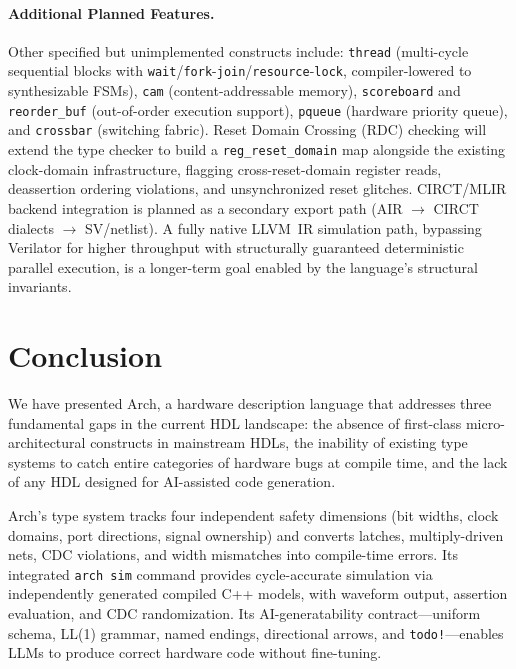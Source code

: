 \documentclass[11pt,twocolumn]{article}
\begin{document}
\paragraph{Additional Planned Features.}
Other specified but unimplemented constructs include:
\texttt{thread} (multi-cycle sequential blocks with \texttt{wait}/\texttt{fork}-\texttt{join}/\texttt{resource}-\texttt{lock}, compiler-lowered to synthesizable FSMs),
\texttt{cam} (content-addressable memory),
\texttt{scoreboard} and \texttt{reorder\_buf} (out-of-order execution support),
\texttt{pqueue} (hardware priority queue),
and \texttt{crossbar} (switching fabric).
Reset Domain Crossing (RDC) checking will extend the type checker to build a \texttt{reg\_reset\_domain} map alongside the existing clock-domain infrastructure, flagging cross-reset-domain register reads, deassertion ordering violations, and unsynchronized reset glitches.
CIRCT/MLIR backend integration is planned as a secondary export path (AIR $\to$ CIRCT dialects $\to$ SV/netlist).
A fully native LLVM~IR simulation path, bypassing Verilator for higher throughput with structurally guaranteed deterministic parallel execution, is a longer-term goal enabled by the language's structural invariants.

\section{Conclusion}\label{sec:conclusion}

We have presented Arch, a hardware description language that addresses three fundamental gaps in the current HDL landscape: the absence of first-class micro-architectural constructs in mainstream HDLs, the inability of existing type systems to catch entire categories of hardware bugs at compile time, and the lack of any HDL designed for AI-assisted code generation.

Arch's type system tracks four independent safety dimensions (bit widths, clock domains, port directions, signal ownership) and converts latches, multiply-driven nets, CDC violations, and width mismatches into compile-time errors.
Its integrated \texttt{arch sim} command provides cycle-accurate simulation via independently generated compiled C++ models, with waveform output, assertion evaluation, and CDC randomization.
Its AI-generatability contract---uniform schema, LL(1) grammar, named endings, directional arrows, and \texttt{todo!}---enables LLMs to produce correct hardware code without fine-tuning.
\end{document}
